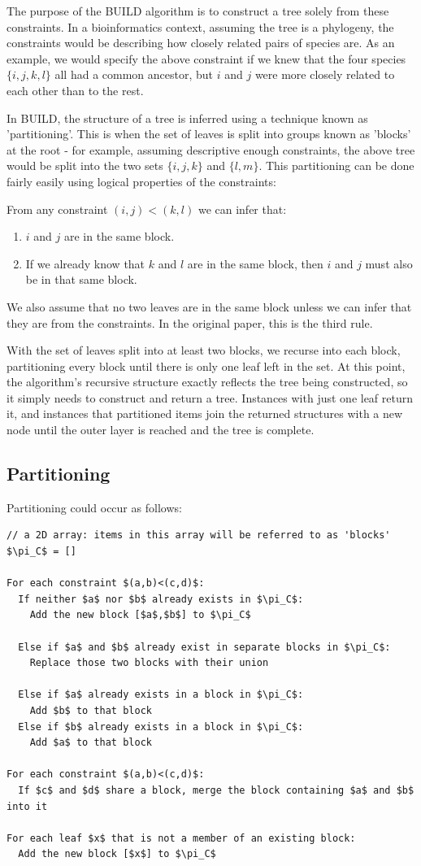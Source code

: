 \documentclass[11pt]{article} %
\begin{document}
The purpose of the BUILD algorithm is to construct a tree solely from these constraints. In a bioinformatics context, assuming the tree is a phylogeny, the constraints would be describing how closely related pairs of species are. As an example, we would specify the above constraint if we knew that the four species $\{i,j,k,l\}$ all had a common ancestor, but $i$ and $j$ were more closely related to each other than to the rest.

In BUILD, the structure of a tree is inferred using a technique known as 'partitioning'. This is when the set of leaves is split into groups known as 'blocks' at the root - for example, assuming descriptive enough constraints, the above tree would be split into the two sets $\{i,j,k\}$ and $\{l,m\}$. This partitioning can be done fairly easily using logical properties of the constraints:

From any constraint $(i,j)<(k,l)$ we can infer that:
\begin{enumerate}
	\item $i$ and $j$ are in the same block.
	\item If we already know that $k$ and $l$ are in the same block, then $i$ and $j$ must also be in that same block.
\end{enumerate}

We also assume that no two leaves are in the same block unless we can infer that they are from the constraints. In the original paper, this is the third rule.

With the set of leaves split into at least two blocks, we recurse into each block, partitioning every block until there is only one leaf left in the set. At this point, the algorithm's recursive structure exactly reflects the tree being constructed, so it simply needs to construct and return a tree. Instances with just one leaf return it, and instances that partitioned items join the returned structures with a new node until the outer layer is reached and the tree is complete.


\subsection{Partitioning}
Partitioning could occur as follows:
\begin{lstlisting}
// a 2D array: items in this array will be referred to as 'blocks'
$\pi_C$ = []

For each constraint $(a,b)<(c,d)$:
  If neither $a$ nor $b$ already exists in $\pi_C$:
    Add the new block [$a$,$b$] to $\pi_C$

  Else if $a$ and $b$ already exist in separate blocks in $\pi_C$:
    Replace those two blocks with their union

  Else if $a$ already exists in a block in $\pi_C$:
    Add $b$ to that block
  Else if $b$ already exists in a block in $\pi_C$:
    Add $a$ to that block

For each constraint $(a,b)<(c,d)$:
  If $c$ and $d$ share a block, merge the block containing $a$ and $b$ into it

For each leaf $x$ that is not a member of an existing block:
  Add the new block [$x$] to $\pi_C$
\end{lstlisting}
\end{document}

